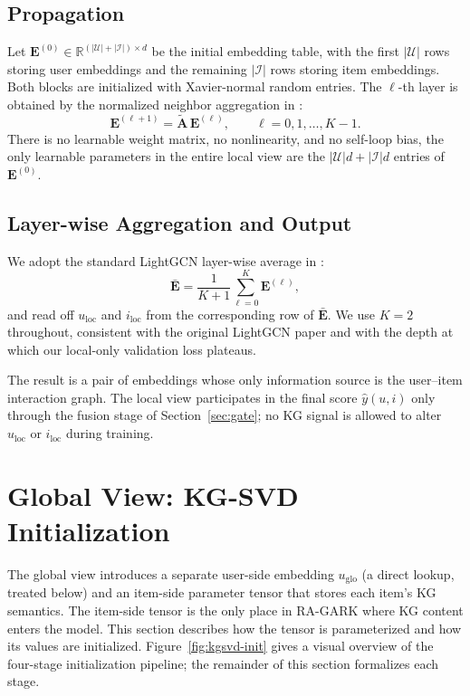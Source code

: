 \subsection{Propagation}
\label{sec:local-prop}

Let $\mathbf{E}^{(0)} \in \mathbb{R}^{(|\mathcal{U}| + |\mathcal{I}|) \times d}$ be the initial embedding table, with the first $|\mathcal{U}|$ rows storing user embeddings and the remaining $|\mathcal{I}|$ rows storing item embeddings. Both blocks are initialized with Xavier-normal random entries. The $\ell$-th layer is obtained by the normalized neighbor aggregation in :
\begin{equation}
\label{eq:lightgcn-prop}
\mathbf{E}^{(\ell+1)} = \tilde{\mathbf{A}}\, \mathbf{E}^{(\ell)}, \qquad \ell = 0, 1, \dots, K-1.
\end{equation}
There is no learnable weight matrix, no nonlinearity, and no self-loop bias, the only learnable parameters in the entire local view are the $|\mathcal{U}|d + |\mathcal{I}|d$ entries of $\mathbf{E}^{(0)}$.

\subsection{Layer-wise Aggregation and Output}
\label{sec:local-output}

We adopt the standard LightGCN layer-wise average in :
\begin{equation}
\label{eq:lightgcn-avg}
\bar{\mathbf{E}} = \frac{1}{K+1} \sum_{\ell=0}^{K} \mathbf{E}^{(\ell)},
\end{equation}
and read off $u_{\mathrm{loc}}$ and $i_{\mathrm{loc}}$ from the corresponding row of $\bar{\mathbf{E}}$. We use $K = 2$ throughout, consistent with the original LightGCN paper and with the depth at which our local-only validation loss plateaus.

The result is a pair of embeddings whose only information source is the user--item interaction graph. The local view participates in the final score $\hat{y}(u,i)$ only through the fusion stage of Section~\ref{sec:gate}; no KG signal is allowed to alter $u_{\mathrm{loc}}$ or $i_{\mathrm{loc}}$ during training.

\section{Global View: KG-SVD Initialization}
\label{sec:kgsvd}

The global view introduces a separate user-side embedding $u_{\mathrm{glo}}$ (a direct lookup, treated below) and an item-side parameter tensor that stores each item's KG semantics. The item-side tensor is the only place in RA-GARK where KG content enters the model. This section describes how the tensor is parameterized and how its values are initialized. Figure~\ref{fig:kgsvd-init} gives a visual overview of the four-stage initialization pipeline; the remainder of this section formalizes each stage.

